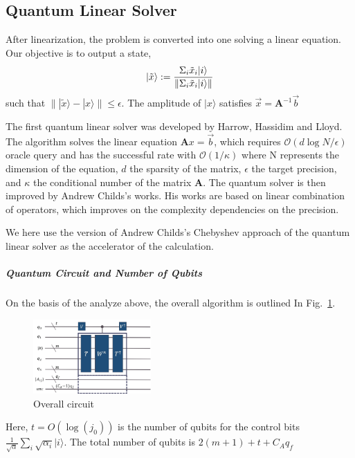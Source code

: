 \documentclass[%
 reprint,
 amsmath,amssymb,
pra,
]{revtex4-1}
\begin{document}
\subsection{Quantum Linear Solver}

After linearization, the problem is converted into one solving a linear equation. Our objective is to output a state, 
\begin{equation}
|\tilde{x}\rangle:=\frac{\Sigma_i \tilde{x}_i|i\rangle}
{\lVert \Sigma_i \tilde{x}_i |i\rangle\rVert}\notag
\end{equation}
such that $\lVert |\tilde{x}\rangle-|x\rangle\rVert\leqslant\epsilon$. The amplitude of $|x\rangle$ satisfies $\vec{x}=\bm{A}^{-1}\vec{b}$

The first quantum linear solver was developed by Harrow, Hassidim and Lloyd. The algorithm solves the linear equation $\bm{A}x = \vec{b}$, which requires $\mathcal{O}(d\log N/\epsilon)$ oracle query and has the successful rate with $\mathcal{O}(1/\kappa)$ where N represents the dimension of the equation, $d$ the sparsity of the matrix, $\epsilon$ the target precision, and $\kappa$ the conditional number of the matrix $\bm{A}$. The quantum solver is then improved by Andrew Childs’s works. His works are based on linear combination of operators, which improves on the complexity dependencies on the precision.

We here use the version of Andrew Childs's Chebyshev approach of the quantum linear solver as the accelerator of the calculation. 

\subparagraph{Quantum Circuit and Number of Qubits}
On the basis of the analyze above, the overall algorithm is outlined In Fig.~\ref{fig:o}.

\begin{figure}[htbp]
\centering
\includegraphics[width=0.4\textwidth]{Fig/overall}
\caption{Overall circuit}
\label{fig:o}
\end{figure}

Here, $t=O(\log(j_0))$ is the number of qubits for the control bits $\frac{1}{\sqrt{\alpha}} \sum_i\sqrt{\alpha_i}|i\rangle$. The total number of qubits is $2(m+1)+t+C_Aq_f$
\end{document}
